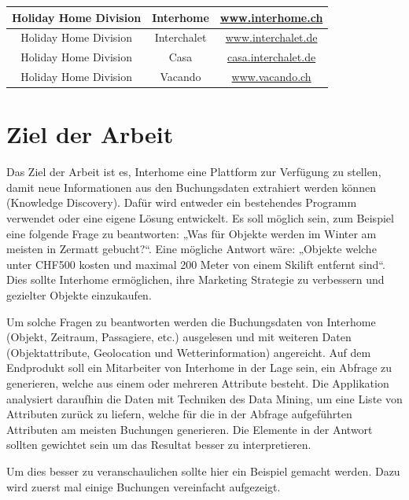 \begin{table}[h]
\begin{tabular}{ | c | c | c |}
		Holiday Home Division & Interhome & \href{http://www.interhome.ch}{www.interhome.ch} \\ \hline 
		Holiday Home Division & Interchalet & \href{http://www.interchalet.de}{www.interchalet.de} \\ \hline 
		Holiday Home Division & Casa & \href{http://casa.interchalet.de}{casa.interchalet.de} \\ \hline 
		Holiday Home Division & Vacando & \href{http://www.vacando.ch}{www.vacando.ch} \\ \hline 
	\end{tabular}
\end{table}

\section{Ziel der Arbeit}
\label{sec:einleitung:ziel}
Das Ziel der Arbeit ist es, Interhome eine Plattform zur Verfügung zu stellen, damit neue Informationen aus den Buchungsdaten extrahiert werden können (Knowledge Discovery). Dafür wird entweder ein bestehendes Programm verwendet oder eine eigene Lösung entwickelt. Es soll möglich sein, zum Beispiel eine folgende Frage zu beantworten: „Was für Objekte werden im Winter am meisten in Zermatt gebucht?“. Eine mögliche Antwort wäre: „Objekte welche unter CHF500 kosten und maximal 200 Meter von einem Skilift entfernt sind“.
Dies sollte Interhome ermöglichen, ihre Marketing Strategie zu verbessern und gezielter Objekte einzukaufen.

Um solche Fragen zu beantworten werden die Buchungsdaten von Interhome (Objekt, Zeitraum, Passagiere, etc.) ausgelesen und mit weiteren Daten (Objektattribute, Geolocation und Wetterinformation) angereicht. 
Auf dem Endprodukt soll ein Mitarbeiter von Interhome in der Lage sein, ein Abfrage zu generieren, welche aus einem oder mehreren Attribute besteht. Die Applikation analysiert daraufhin die Daten mit Techniken des Data Mining, um eine Liste von Attributen zurück zu liefern, welche für die in der Abfrage aufgeführten Attributen am meisten Buchungen generieren. Die Elemente in der Antwort sollten gewichtet sein um das Resultat besser zu interpretieren.

Um dies besser zu veranschaulichen sollte hier ein Beispiel gemacht werden. Dazu wird zuerst mal einige Buchungen vereinfacht aufgezeigt.

